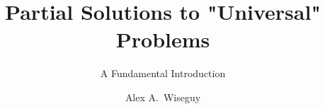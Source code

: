\documentclass[type=master,degree=engineering,theme=default,language=english,smartquotes=true,aiusage=detailed]{hgbthesis}
\begin{document}


\title{Partial Solutions to "Universal" Problems}
\subtitle{A Fundamental Introduction}
\author{Alex A.\ Wiseguy}







\frontmatter                                   %

\maketitle
\tableofcontents




\mainmatter                                    %









\end{document}
